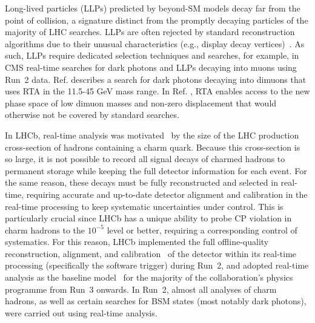 Long-lived particles (LLPs) predicted by beyond-SM models decay far from the point of collision, a signature distinct from the promptly decaying particles of the majority of LHC searches. LLPs are often rejected by standard reconstruction algorithms due to their unusual characteristics (e.g., display decay vertices)~\cite{llps}. As such, LLPs require dedicated selection techniques and searches, for example, in CMS real-time searches for dark photons and LLPs decaying into muons using Run~2 data.  Ref. \cite{CMS:2019buh} describes a search for dark photons decaying into dimuons that uses RTA in the 11.5-45 GeV mass range. In Ref. \cite{CMS:2021sch}, RTA enables access to the new phase space of low dimuon masses and non-zero displacement that would otherwise not be covered by standard searches.



In LHCb, real-time analysis was motivated~\cite{Gligorov:2018fuk} by the size of the LHC production cross-section of hadrons containing a charm 
quark. Because this cross-section is so large, it is not possible to record all signal decays of charmed hadrons to permanent storage while keeping the full detector information for each event. For the same reason, these decays must be fully reconstructed and selected in real-time, requiring accurate and up-to-date detector alignment and calibration in the real-time processing to keep systematic uncertainties under control. This is particularly crucial since LHCb has a unique ability to probe CP violation in charm hadrons to the $10^{-5}$ level or better, requiring a corresponding control of systematics. For this reason, LHCb implemented the full offline-quality reconstruction, alignment, and calibration~\cite{Dujany:2015lxd, Aaij:2016rxn, Borghi:2017hfp, LHCb:2018zdd, Aaij:2019uij} of the detector within its real-time processing (specifically the software trigger) during Run~2, and adopted real-time analysis as the baseline model~\cite{LHCbCollaboration:2319756} for the majority of the collaboration's physics programme from Run~3 onwards. In Run~2, almost all analyses of charm hadrons, as well as certain searches for BSM states (most notably dark photons), were carried out using real-time analysis.
